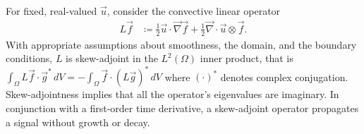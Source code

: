 \documentclass[letterpaper,reqno,11pt]{amsart}
\newcommand{\vecnabla}{\ensuremath{\vec{\nabla}}}
\begin{document}
For fixed, real-valued $\vec{u}$, consider the convective linear operator
\begin{align}
  L\vec{f} &\coloneqq
      \frac{1}{2}\vec{u}\cdot\vecnabla{}\vec{f}
    + \frac{1}{2}\vecnabla\cdot\vec{u}\otimes\vec{f}.
\end{align}
With appropriate assumptions about smoothness, the domain, and the boundary
conditions, $L$ is skew-adjoint in the $L^2\left(\Omega\right)$ inner product,
that is $ \int_{\Omega} L\vec{f}\cdot\vec{g}^{\ast}\,d\!V = -\int_{\Omega}
\vec{f}\cdot{}\left(L\vec{g}\right)^{\ast} \,d\!V$ where
$\left(\cdot\right)^\ast$ denotes complex conjugation.  Skew-adjointness
implies that all the operator's eigenvalues are imaginary.  In conjunction with
a first-order time derivative, a skew-adjoint operator propagates a signal
without growth or decay.
\end{document}
